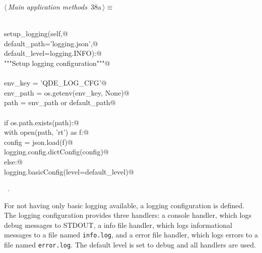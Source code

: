\documentclass[
    a4paper,      %
    10pt,         %
    openright,    %
    notitlepage,  %
    parskip=half, %
]{scrreprt}       %
\theoremstyle{definition}                    %
\begin{document}
\begin{flushleft} \small
\begin{minipage}{\linewidth}\label{scrap46}\raggedright\small
{} $\langle\,${\itshape Main application methods}\nobreak\ {\footnotesize {38a}}$\,\rangle\equiv$
\vspace{-1ex}
\begin{list}{}{} \item
\mbox{}\lstinline@@\\
\mbox{}\lstinline@def setup_logging(self,@\\
\mbox{}\lstinline@                  default_path='logging.json',@\\
\mbox{}\lstinline@                  default_level=logging.INFO):@\\
\mbox{}\lstinline@    """Setup logging configuration"""@\\
\mbox{}\lstinline@@\\
\mbox{}\lstinline@    env_key  = 'QDE_LOG_CFG'@\\
\mbox{}\lstinline@    env_path = os.getenv(env_key, None)@\\
\mbox{}\lstinline@    path     = env_path or default_path@\\
\mbox{}\lstinline@@\\
\mbox{}\lstinline@    if os.path.exists(path):@\\
\mbox{}\lstinline@        with open(path, 'rt') as f:@\\
\mbox{}\lstinline@            config = json.load(f)@\\
\mbox{}\lstinline@            logging.config.dictConfig(config)@\\
\mbox{}\lstinline@    else:@\\
\mbox{}\lstinline@        logging.basicConfig(level=default_level)@{\NWsep}
\end{list}
\vspace{-1.5ex}
\footnotesize
\begin{list}{}{\setlength{\itemsep}{-\parsep}\setlength{\itemindent}{-\leftmargin}}
\item \NWtxtMacroRefIn\ .

\item{}
\end{list}
\end{minipage}\vspace{4ex}
\end{flushleft}
For not having only basic logging available, a logging configuration is defined.
The logging configuration provides three handlers: a console handler, which logs
debug messages to STDOUT, a info file handler, which logs informational messages
to a file named \verb+info.log+, and a error file handler, which logs errors to
a file named \verb+error.log+. The default level is set to debug and all
handlers are used.
\end{document}
